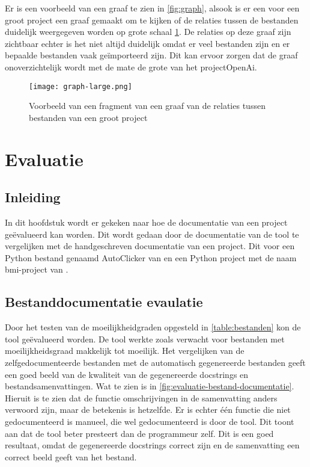 Er is een voorbeeld van een graaf te zien in \ref{fig:graph}, alsook is er een voor een groot project een graaf gemaakt om te kijken of de relaties tussen de bestanden duidelijk weergegeven worden op grote schaal \ref{fig:graph-large}.
De relaties op deze graaf zijn zichtbaar echter is het niet altijd duidelijk omdat er veel bestanden zijn en er bepaalde bestanden vaak geïmporteerd zijn.
Dit kan ervoor zorgen dat de graaf onoverzichtelijk wordt met de mate de grote van het projectOpenAi.

\begin{figure}[h]
    \centering
    \texttt{[image: graph-large.png]}
    \caption{Voorbeeld van een fragment van een graaf van de relaties tussen bestanden van een groot project}
    \label{fig:graph-large}
\end{figure}

\section{Evaluatie}
\label{sec:project-documentatie-evaluatie}

\subsection{Inleiding}
\label{sec:project-documentatie-evaluatie-inleiding}

In dit hoofdstuk wordt er gekeken naar hoe de documentatie van een project geëvalueerd kan worden.
Dit wordt gedaan door de documentatie van de tool te vergelijken met de handgeschreven documentatie van een project.
Dit voor een Python bestand genaamd AutoClicker van \textcite{Waegeneer2022} en een Python project met de naam bmi-project van \textcite{Simmons2019}.

\subsection{Bestanddocumentatie evaulatie}
\label{sec:project-documentatie-evaluatie-bestand}

Door het testen van de moeilijkheidgraden opgesteld in \ref{table:bestanden} kon de tool geëvalueerd worden.
De tool werkte zoals verwacht voor bestanden met moeilijkheidsgraad makkelijk tot moeilijk.
Het vergelijken van de zelfgedocumenteerde bestanden met de automatisch gegenereerde bestanden geeft een goed beeld van de kwaliteit van de gegenereerde docstrings en bestandsamenvattingen.
Wat te zien is in \ref{fig:evaluatie-bestand-documentatie}.
Hieruit is te zien dat de functie omschrijvingen in de samenvatting anders verwoord zijn, maar de betekenis is hetzelfde.
Er is echter één functie die niet gedocumenteerd is manueel, die wel gedocumenteerd is door de tool.
Dit toont aan dat de tool beter presteert dan de programmeur zelf.
Dit is een goed resultaat, omdat de gegenereerde docstrings correct zijn en de samenvatting een correct beeld geeft van het bestand.

